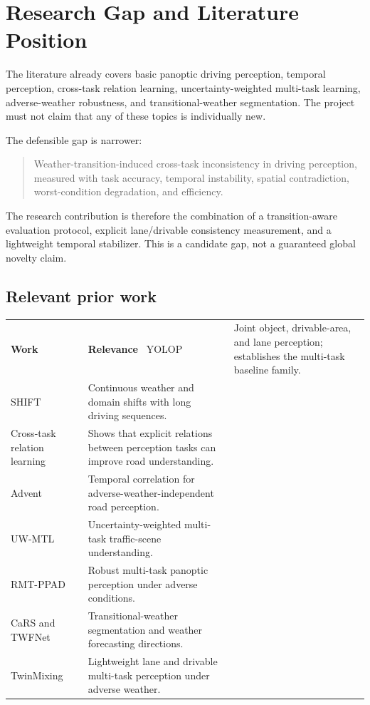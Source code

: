\documentclass[11pt,a4paper]{article}
\begin{document}
\section{Research Gap and Literature Position}

The literature already covers basic panoptic driving perception, temporal perception, cross-task relation learning, uncertainty-weighted multi-task learning, adverse-weather robustness, and transitional-weather segmentation. The project must not claim that any of these topics is individually new.

The defensible gap is narrower:
\begin{quote}
Weather-transition-induced cross-task inconsistency in driving perception, measured with task accuracy, temporal instability, spatial contradiction, worst-condition degradation, and efficiency.
\end{quote}

The research contribution is therefore the combination of a transition-aware evaluation protocol, explicit lane/drivable consistency measurement, and a lightweight temporal stabilizer. This is a candidate gap, not a guaranteed global novelty claim.

\subsection{Relevant prior work}
\begin{longtable}{p{}p{}}
\toprule
\textbf{Work} & \textbf{Relevance}\
\midrule
YOLOP & Joint object, drivable-area, and lane perception; establishes the multi-task baseline family.\\
SHIFT & Continuous weather and domain shifts with long driving sequences.\\
Cross-task relation learning & Shows that explicit relations between perception tasks can improve road understanding.\\
Advent & Temporal correlation for adverse-weather-independent road perception.\\
UW-MTL & Uncertainty-weighted multi-task traffic-scene understanding.\\
RMT-PPAD & Robust multi-task panoptic perception under adverse conditions.\\
CaRS and TWFNet & Transitional-weather segmentation and weather forecasting directions.\\
TwinMixing & Lightweight lane and drivable multi-task perception under adverse weather.\\
\bottomrule
\end{longtable}
\end{document}
